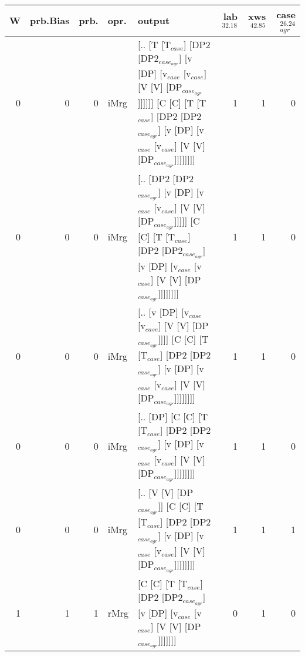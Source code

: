 \begin{tabularx}{\linewidth}{rrrlXrrr}
\hline
   W &   prb.Bias &   prb. & opr.   & output                                                                                                                                                                             &   lab$^{32.18}$ &   xws$^{42.85}$ &   case$_{agr}^{26.24}$ \\
\hline
   0 &       0 &   0 & iMrg & [.. [T [T$_{case}$] [DP2 [DP2$_{case_{agr}}$] [v [DP] [v$_{case}$ [v$_{case}$] [V [V] [DP$_{case_{agr}}$]]]]]] [C [C] [T [T$_{case}$] [DP2 [DP2$_{case_{agr}}$] [v [DP] [v$_{case}$ [v$_{case}$] [V [V] [DP$_{case_{agr}}$]]]]]]]] &             1 &             1 &                  0 \\
   0 &       0 &   0 & iMrg & [.. [DP2 [DP2$_{case_{agr}}$] [v [DP] [v$_{case}$ [v$_{case}$] [V [V] [DP$_{case_{agr}}$]]]]] [C [C] [T [T$_{case}$] [DP2 [DP2$_{case_{agr}}$] [v [DP] [v$_{case}$ [v$_{case}$] [V [V] [DP$_{case_{agr}}$]]]]]]]]              &             1 &             1 &                  0 \\
   0 &       0 &   0 & iMrg & [.. [v [DP] [v$_{case}$ [v$_{case}$] [V [V] [DP$_{case_{agr}}$]]]] [C [C] [T [T$_{case}$] [DP2 [DP2$_{case_{agr}}$] [v [DP] [v$_{case}$ [v$_{case}$] [V [V] [DP$_{case_{agr}}$]]]]]]]]                                   &             1 &             1 &                  0 \\
   0 &       0 &   0 & iMrg & [.. [DP] [C [C] [T [T$_{case}$] [DP2 [DP2$_{case_{agr}}$] [v [DP] [v$_{case}$ [v$_{case}$] [V [V] [DP$_{case_{agr}}$]]]]]]]]                                                                               &             1 &             1 &                  0 \\
   0 &       0 &   0 & iMrg & [.. [V [V] [DP$_{case_{agr}}$]] [C [C] [T [T$_{case}$] [DP2 [DP2$_{case_{agr}}$] [v [DP] [v$_{case}$ [v$_{case}$] [V [V] [DP$_{case_{agr}}$]]]]]]]]                                                              &             1 &             1 &                  1 \\
   1 &       1 &   1 & rMrg & [C [C] [T [T$_{case}$] [DP2 [DP2$_{case_{agr}}$] [v [DP] [v$_{case}$ [v$_{case}$] [V [V] [DP$_{case_{agr}}$]]]]]]]                                                                                         &             0 &             1 &                  0 \\
\hline
\end{tabularx}\endgroup\\
